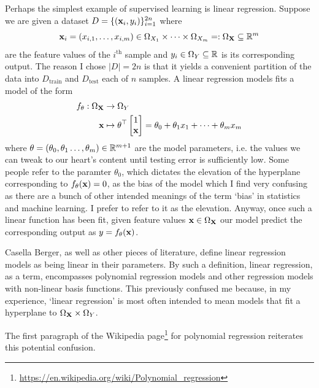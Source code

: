 \documentclass[11pt]{article}
\begin{document}
Perhaps the simplest example of supervised learning is linear regression. Suppose we are given a dataset $D=\{(\mathbf{x}_i,y_i)\}_{i=1}^{2n}$ where
$$
\mathbf{x}_i=(x_{i,1},\dots,x_{i, m})\in \Omega_{X_1}\times\dots\times \Omega_{X_m}=:\Omega_{\mathbf{X}}\subseteq\mathbb{R}^m
$$
are the feature values of the $i^{\text{th}}$ sample and $y_i\in \Omega_{Y}\subseteq\mathbb{R}$ is its corresponding output. The reason I chose $|D|=2n$ is that it yields a convenient partition of the data into $D_{\text{train}}$ and $D_{\text{test}}$ each of $n$ samples. A linear regression models fits a model of the form
\begin{align*}
    f_{\theta}:\Omega_{\mathbf{X}}&\rightarrow \Omega_Y\\
    \mathbf{x}&\mapsto
    \theta^{\top}
    \begin{bmatrix}
        1\\
        \mathbf{x}
    \end{bmatrix}
    =
    \theta_0+\theta_1x_1+\dots+\theta_mx_m 
\end{align*}
where $\theta=(\theta_0,\theta_1\dots,\theta_m)\in\mathbb{R}^{m+1}$ are the model parameters, i.e. the values we can tweak to our heart's content until testing error is sufficiently low. Some people refer to the paramter $\theta_0$, which dictates the elevation of the hyperplane corresponding to $f_{\theta}(\mathbf{x})=0$, as the bias of the model which I find very confusing as there are a bunch of other intended meanings of the term `bias' in statistics and machine learning. I prefer to refer to it as the elevation. Anyway, once such a linear function has been fit, given feature values $\mathbf{x}\in\Omega_{\mathbf{X}}$ our model predict the corresponding output as $y=f_{\theta}(\mathbf{x})$.

\begin{tcolorbox}[title={\centering\textbf{What does the `linear' in linear regression actually refer to?}}, colback=myLightBlue, colbacktitle=myDarkBlue, colframe=myDarkBlue, coltitle=white]
    Casella Berger, as well as other pieces of literature, define linear regression models as being linear in their parameters. By such a definition, linear regression, as a term, encompasses polynomial regression models and other regression models with non-linear basis functions. This previously confused me because, in my experience, `linear regression' is most often intended to mean models that fit a hyperplane to $\Omega_{\mathbf{X}}\times\Omega_Y$.
    
    \hspace{14.52pt} The first paragraph of the Wikipedia page\footnote{\url{https://en.wikipedia.org/wiki/Polynomial_regression}} for polynomial regression reiterates this potential confusion.
\end{tcolorbox}
\end{document}
